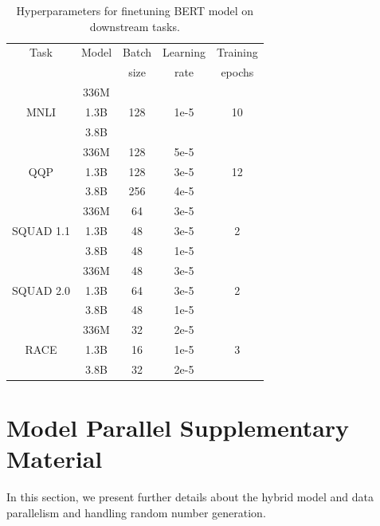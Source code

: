 \documentclass{article}
\begin{document}
\begin{table}[hbt!]
\footnotesize
\begin{center}
\caption{Hyperparameters for finetuning BERT model on downstream tasks.}
\label{tab:bert_tasks_hparams}
\begin{tabular}{c|c|c|c|c} \hline \hline
Task      & Model & Batch & Learning & Training \\
          &       & size  & rate     & epochs   \\ \hline
          & 336M  &       &          &          \\ 
MNLI      & 1.3B  & 128   & 1e-5     & 10       \\ 
          & 3.8B  &       &          &          \\ \hline 
          & 336M  &   128    & 5e-5     &          \\ 
QQP       & 1.3B  & 128   & 3e-5     & 12      \\ 
          & 3.8B  &  256     & 4e-5     &          \\ \hline 
          & 336M  & 64    & 3e-5     &          \\ 
SQUAD 1.1 & 1.3B  & 48    & 3e-5     & 2        \\ 
          & 3.8B  & 48    & 1e-5     &          \\ \hline 
          & 336M  & 48    & 3e-5     &          \\ 
SQUAD 2.0 & 1.3B  & 64    & 3e-5     & 2        \\ 
          & 3.8B  & 48    & 1e-5     &          \\ \hline 
          & 336M  & 32    & 2e-5     &          \\ 
RACE      & 1.3B  & 16   & 1e-5     & 3        \\ 
          & 3.8B  & 32    & 2e-5     &          \\ \hline 
\end{tabular}
\end{center}
\end{table}

\section{Model Parallel Supplementary Material }
\label{sec:modelpar:supp}

In this section, we present further details about the hybrid model and data parallelism and handling random number generation.
\end{document}
